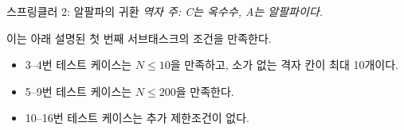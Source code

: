 \begin{problem}{스프링클러 2: 알팔파의 귀환}
	\textit{역자 주: C는 옥수수, A는 알팔파이다.}
	
	\begin{example}
	\end{example}
	
	이는 아래 설명된 첫 번째 서브태스크의 조건을 만족한다.	
	
	\Scoring
	
	\begin{itemize}
		\item 3--4번 테스트 케이스는 $N \le 10$을 만족하고, 소가 없는 격자 칸이 최대 10개이다.
		\item 5--9번 테스트 케이스는 $N \le 200$을 만족한다.
		\item 10--16번 테스트 케이스는 추가 제한조건이 없다.
	\end{itemize}
	
	
	
	
\end{problem}

